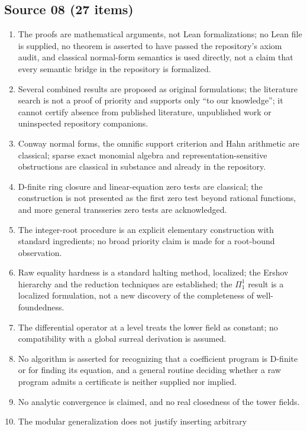 \documentclass[11pt,oneside]{article}
\numberwithin{equation}{section}
\theoremstyle{definition}
\theoremstyle{remark}
\begin{document}
\subsection{Source 08 (27 items)}
\begin{enumerate}[leftmargin=*,widest=00,label=08.\arabic*]
\item The proofs are mathematical arguments, not Lean formalizations; no Lean file
is supplied, no theorem is asserted to have passed the repository's axiom audit,
and classical normal-form semantics is used directly, not a claim that every
semantic bridge in the repository is formalized.
\item Several combined results are proposed as original formulations; the
literature search is not a proof of priority and supports only ``to our
knowledge''; it cannot certify absence from published literature, unpublished work
or uninspected repository companions.
\item Conway normal forms, the omnific support criterion and Hahn arithmetic are
classical; sparse exact monomial algebra and representation-sensitive obstructions
are classical in substance and already in the repository.
\item D-finite ring closure and linear-equation zero tests are classical; the
construction is not presented as the first zero test beyond rational functions,
and more general transseries zero tests are acknowledged.
\item The integer-root procedure is an explicit elementary construction with
standard ingredients; no broad priority claim is made for a root-bound
observation.
\item Raw equality hardness is a standard halting method, localized; the Ershov
hierarchy and the reduction techniques are established; the $\Pi^1_1$ result is a
localized formulation, not a new discovery of the completeness of
well-foundedness.
\item The differential operator at a level treats the lower field as constant; no
compatibility with a global surreal derivation is assumed.
\item No algorithm is asserted for recognizing that a coefficient program is
D-finite or for finding its equation, and a general routine deciding whether a raw
program admits a certificate is neither supplied nor implied.
\item No analytic convergence is claimed, and no real closedness of the tower
fields.
\item The modular generalization does not justify inserting arbitrary

\end{enumerate}
\end{document}
